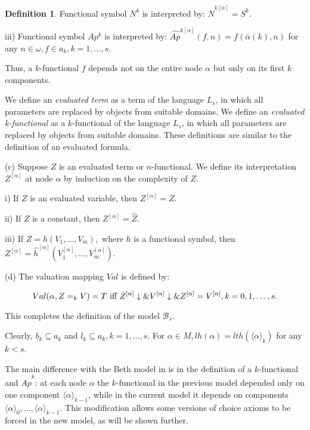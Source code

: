 \documentclass{asl}
\theoremstyle{definition}
\newtheorem{definition}{Definition}[section]
\begin{document}
\begin{definition}
Functional symbol $ N^{k} $ is interpreted by: $ \widehat{N}^{k[\alpha]} = S^{k}$.
\medskip

iii) Functional symbol $ Ap^{k} $ is interpreted by: 
$ \widehat{Ap}^{k[\alpha]}(f,n)=f(\bar{\alpha}(k),n) $ for any $ n\in \omega, f\in a_{k}, k=1, \ldots, s$.

Thus, a $ k$-functional $ f $ depends not on the entire node $ \alpha $ but only on its first $k$ components.
\medskip

We define an \textit{evaluated term} as a term of the language $ L_s $, in which all parameters are replaced by objects from suitable domains. We define an
\textit{evaluated k-functional}  as a $ k $-functional of the language $ L_s $, in which all parameters are replaced by objects from suitable domains. These definitions are similar to the definition of an evaluated formula.

(c) Suppose $ Z $ is an evaluated term or $ n$-functional. We define its interpretation $ Z^{[\alpha]} $ at node $ \alpha $ by induction on the complexity of $ Z. $
\smallskip

i) If $ Z $ is an evaluated variable, then $ Z^{[\alpha]} = Z. $
\smallskip

ii) If $ Z $ is a constant, then $  Z^{[\alpha]} = \widehat{Z}. $
\smallskip

iii) If $ Z=h(V_{1}, \ldots, V_{m}), $ where $ h $ is a functional symbol, then 
\medskip
\\$  Z^{[\alpha]} = \widehat{h}^{[\alpha]}(V_{1}^{[\alpha]},\ldots, V_{m}^{[\alpha]}). $
\medskip

(d) The valuation mapping $ Val $ is defined by:

\[Val(\alpha,Z=_kV)=T \textup{    iff    } 
Z^{[\alpha]}\downarrow \& V^{[\alpha]}\downarrow \& Z^{[\alpha]}=V^{[\alpha]},k=0,1,\ldots,s.\]

This completes the definition of the model 
$\mathcal{B}_s$. \label{def:my_beth_model}
\end{definition}

Clearly, $ b_{k}\subseteq a_{k}$ and $l_{k}\subseteq a_{k}, k=1,\ldots,s$. 
For $ \alpha\in M, lh(\alpha)=lth(\langle\alpha\rangle_k) $ for any $ k<s $.

The main difference with the Beth model in \cite{kach13} is in the definition of a $k$-functional and $\widehat{Ap}^k$: at each node $\alpha$ the $k$-functional in the previous model depended only on one component $\langle\alpha\rangle_{k-1}$, while in the current model it depends on components $\langle\alpha\rangle_{0}, \ldots,\langle\alpha\rangle_{k-1}$. This modification allows some versions of choice axioms to be forced in the new model, as will be shown further.
   
\end{document}
